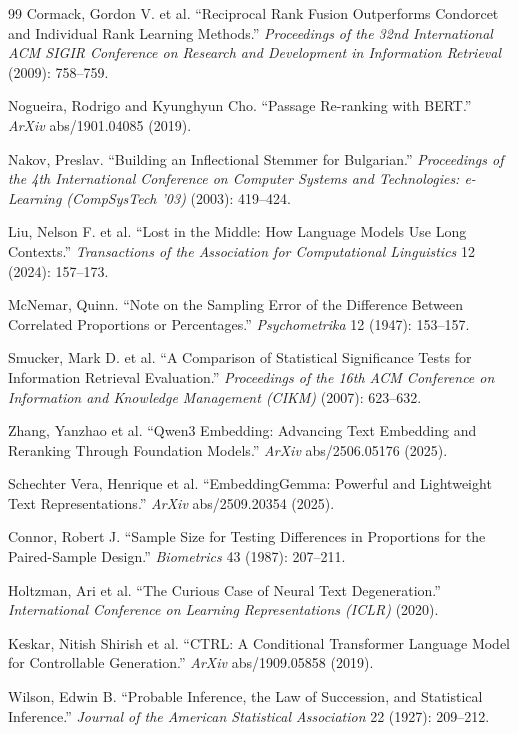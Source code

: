 \documentclass[12pt,a4paper]{article}
\begin{document}
{\begin{thebibliography}{99}
Cormack, Gordon V. et al.
“Reciprocal Rank Fusion Outperforms Condorcet and Individual Rank Learning Methods.”
\emph{Proceedings of the 32nd International ACM SIGIR Conference on Research and Development in Information Retrieval} (2009): 758--759.

Nogueira, Rodrigo and Kyunghyun Cho.
“Passage Re-ranking with BERT.”
\emph{ArXiv} abs/1901.04085 (2019).

Nakov, Preslav.
“Building an Inflectional Stemmer for Bulgarian.”
\emph{Proceedings of the 4th International Conference on Computer Systems and Technologies: e-Learning (CompSysTech '03)} (2003): 419--424.

Liu, Nelson F. et al.
“Lost in the Middle: How Language Models Use Long Contexts.”
\emph{Transactions of the Association for Computational Linguistics} 12 (2024): 157--173.

McNemar, Quinn.
“Note on the Sampling Error of the Difference Between Correlated Proportions or Percentages.”
\emph{Psychometrika} 12 (1947): 153--157.

Smucker, Mark D. et al.
“A Comparison of Statistical Significance Tests for Information Retrieval Evaluation.”
\emph{Proceedings of the 16th ACM Conference on Information and Knowledge Management (CIKM)} (2007): 623--632.

Zhang, Yanzhao et al.
“Qwen3 Embedding: Advancing Text Embedding and Reranking Through Foundation Models.”
\emph{ArXiv} abs/2506.05176 (2025).

Schechter Vera, Henrique et al.
“EmbeddingGemma: Powerful and Lightweight Text Representations.”
\emph{ArXiv} abs/2509.20354 (2025).

Connor, Robert J.
“Sample Size for Testing Differences in Proportions for the Paired-Sample Design.”
\emph{Biometrics} 43 (1987): 207--211.

Holtzman, Ari et al.
“The Curious Case of Neural Text Degeneration.”
\emph{International Conference on Learning Representations (ICLR)} (2020).

Keskar, Nitish Shirish et al.
“CTRL: A Conditional Transformer Language Model for Controllable Generation.”
\emph{ArXiv} abs/1909.05858 (2019).

Wilson, Edwin B.
“Probable Inference, the Law of Succession, and Statistical Inference.”
\emph{Journal of the American Statistical Association} 22 (1927): 209--212.


\end{thebibliography}}
\end{document}
